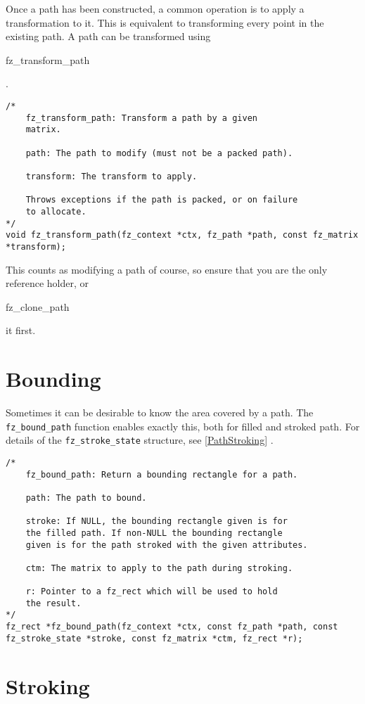 \documentclass[oneside]{book}
\newcommand{\rjwref}[1] {\autoref{#1} \nameref{#1}}
\begin{document}
Once a path has been constructed, a common operation is to apply a transformation to it. This is equivalent to transforming every point in the existing path. A path can be transformed using \begin{tt}fz\_transform\_path\end{tt}.

\begin{lstlisting}
/*
	fz_transform_path: Transform a path by a given
	matrix.

	path: The path to modify (must not be a packed path).

	transform: The transform to apply.

	Throws exceptions if the path is packed, or on failure
	to allocate.
*/
void fz_transform_path(fz_context *ctx, fz_path *path, const fz_matrix *transform);
\end{lstlisting}

This counts as modifying a path of course, so ensure that you are the only reference holder, or \begin{tt}fz\_clone\_path\end{tt} it first.

\section{Bounding}

Sometimes it can be desirable to know the area covered by a path. The \texttt{fz\_bound\_path} function enables exactly this, both for filled and stroked path. For details of the \texttt{fz\_stroke\_state} structure, see \rjwref{PathStroking}.

\begin{lstlisting}
/*
	fz_bound_path: Return a bounding rectangle for a path.

	path: The path to bound.

	stroke: If NULL, the bounding rectangle given is for
	the filled path. If non-NULL the bounding rectangle
	given is for the path stroked with the given attributes.

	ctm: The matrix to apply to the path during stroking.

	r: Pointer to a fz_rect which will be used to hold
	the result.
*/
fz_rect *fz_bound_path(fz_context *ctx, const fz_path *path, const fz_stroke_state *stroke, const fz_matrix *ctm, fz_rect *r);
\end{lstlisting}

\section{Stroking}
\label{PathStroking}
\end{document}
